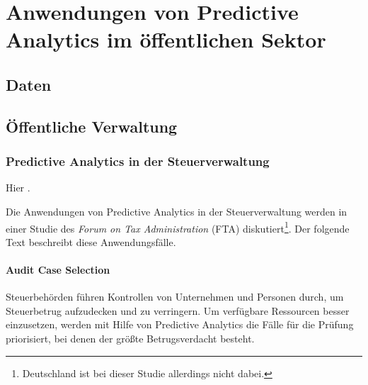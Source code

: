 \chapter{Anwendungen von Predictive Analytics im öffentlichen Sektor}


\section{Daten}


\section{Öffentliche Verwaltung}




\subsection{Predictive Analytics in der Steuerverwaltung}

Hier \cite{OECD}.


Die Anwendungen von Predictive Analytics in der Steuerverwaltung werden in einer
Studie des \emph{Forum on Tax Administration} (FTA) diskutiert\footnote{
Deutschland ist bei dieser Studie allerdings nicht dabei.
}. Der folgende Text beschreibt diese Anwendungsfälle.

\subsubsection{Audit Case Selection}

Steuerbehörden führen Kontrollen von Unternehmen und Personen durch, um Steuerbetrug
aufzudecken und zu verringern. Um verfügbare Ressourcen besser einzusetzen, werden mit Hilfe
von Predictive Analytics die Fälle für die Prüfung priorisiert, bei denen der größte Betrugsverdacht
besteht.

